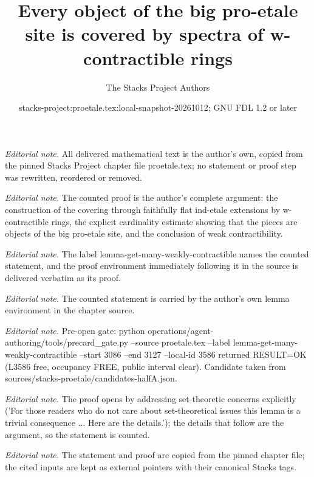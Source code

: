 \documentclass[10pt,a4paper]{amsart}
\title{Every object of the big pro-etale site is covered by spectra of w-contractible rings}
\author{The Stacks Project Authors}
\date{stacks-project:proetale.tex:local-snapshot-20261012; GNU FDL 1.2 or later}
\theoremstyle{plain}
\theoremstyle{definition}
\theoremstyle{remark}
\numberwithin{equation}{subsection}
\begin{document}
\maketitle
\noindent\textit{Editorial note.} All delivered mathematical text is the author's own, copied from the pinned Stacks Project chapter file proetale.tex; no statement or proof step was rewritten, reordered or removed.\par\medskip
\noindent\textit{Editorial note.} The counted proof is the author's complete argument: the construction of the covering through faithfully flat ind-etale extensions by w-contractible rings, the explicit cardinality estimate showing that the pieces are objects of the big pro-etale site, and the conclusion of weak contractibility.\par\medskip
\noindent\textit{Editorial note.} The label lemma-get-many-weakly-contractible names the counted statement, and the proof environment immediately following it in the source is delivered verbatim as its proof.\par\medskip
\noindent\textit{Editorial note.} The counted statement is carried by the author's own lemma environment in the chapter source.\par\medskip
\noindent\textit{Editorial note.} Pre-open gate: python operations/agent-authoring/tools/precard\_gate.py --source proetale.tex --label lemma-get-many-weakly-contractible --start 3086 --end 3127 --local-id 3586 returned RESULT=OK (L3586 free, occupancy FREE, public interval clear). Candidate taken from sources/stacks-proetale/candidates-halfA.json.\par\medskip
\noindent\textit{Editorial note.} The proof opens by addressing set-theoretic concerns explicitly ('For those readers who do not care about set-theoretical issues this lemma is a trivial consequence ... Here are the details.'); the details that follow are the argument, so the statement is counted.\par\medskip
\noindent\textit{Editorial note.} The statement and proof are copied from the pinned chapter file; the cited inputs are kept as external pointers with their canonical Stacks tags.\par\medskip
\end{document}
